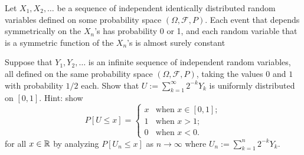 \begin{shaded}
\begin{theorem}
Let $X_1,X_2,\ldots$ be a sequence of independent identically distributed random variables defined on some probability space $(\Omega, \mathcal F, P)$. Each event that depends symmetrically on the $X_n$'s has probability 0 or 1, and each random variable that is a symmetric function of the $X_n$'s is almost surely constant
\end{theorem}
\end{shaded}



\begin{exercise}
Suppose that $Y_1, Y_2, \ldots$ is an infinite sequence of independent random variables, all defined on the same probability space $(\Omega, \mathcal F, P)$, taking the values $0$ and $1$ with probability $1/2$ each. Show that $U:= \sum_{k=1}^\infty 2^{-k} Y_k$ is uniformly distributed on $[0,1]$. Hint: show
\[
P[U \leq x] =\begin{cases}
x & \text{when $x\in [0,1]$}; \\
1 & \text{when $x>1$}; \\
0 & \text{when $x<0$}.
\end{cases}
\] for all $x\in \Bbb R$ by analyzing $P[U_n \leq x]$ as $n\rightarrow \infty$ where $U_n:=\sum_{k=1}^n 2^{-k} Y_k$.
\end{exercise}

